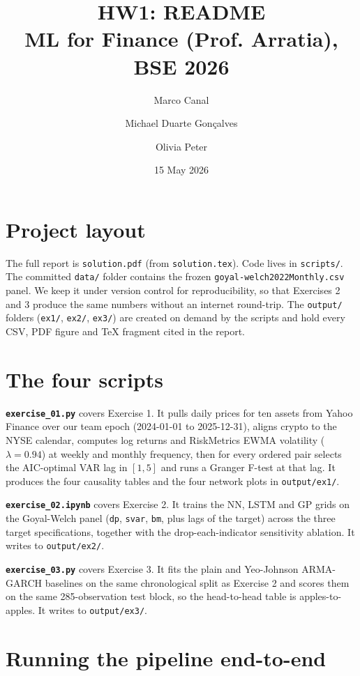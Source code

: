 \documentclass[11pt,a4paper]{article}
\title{\vspace{-1.5em}HW1:  README\\
       \large ML for Finance (Prof. Arratia), BSE 2026}
\author{Marco Canal \and Michael Duarte Gonçalves \and Olivia Peter}
\date{15 May 2026}
\newcommand{\code}[1]{\texttt{#1}}
\begin{document}
\maketitle

\section*{Project layout}

The full report is \code{solution.pdf} (from \code{solution.tex}). Code lives
in \code{scripts/}. The committed \code{data/} folder contains the frozen
\code{goyal-welch2022Monthly.csv} panel. We keep it under version control
for reproducibility, so that Exercises 2 and 3 produce the same numbers
without an internet round-trip. The \code{output/} folders (\code{ex1/},
\code{ex2/}, \code{ex3/}) are created on demand by the scripts and hold
every CSV, PDF figure and TeX fragment cited in the report.

\section*{The four scripts}

\textbf{\code{exercise\_01.py}} covers Exercise 1. It pulls daily prices
for ten assets from Yahoo Finance over our team epoch (2024-01-01 to
2025-12-31), aligns crypto to the NYSE calendar, computes log returns and
RiskMetrics EWMA volatility ($\lambda=0.94$) at weekly and monthly
frequency, then for every ordered pair selects the AIC-optimal VAR lag in
$[1,5]$ and runs a Granger F-test at that lag. It produces the four
causality tables and the four network plots in \code{output/ex1/}.

\textbf{\code{exercise\_02.ipynb}} covers Exercise 2. It trains the NN,
LSTM and GP grids on the Goyal-Welch panel (\code{dp}, \code{svar},
\code{bm}, plus lags of the target) across the three target specifications,
together with the drop-each-indicator sensitivity ablation. It writes to
\code{output/ex2/}.

\textbf{\code{exercise\_03.py}} covers Exercise 3. It fits the plain and
Yeo-Johnson ARMA-GARCH baselines on the same chronological split as
Exercise 2 and scores them on the same 285-observation test block, so the
head-to-head table is apples-to-apples. It writes to \code{output/ex3/}.

\section*{Running the pipeline end-to-end}
\end{document}
